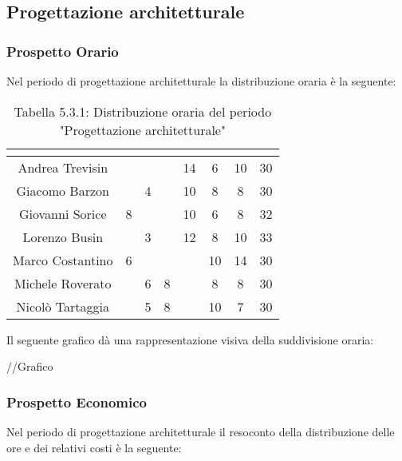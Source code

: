 \subsection{Progettazione architetturale}

\subsubsection{Prospetto Orario}
Nel periodo di progettazione architetturale la distribuzione oraria è la seguente:

\renewcommand{\arraystretch}{1.5}
\begin{table}[H]
\begin{center}
\begin{tabular}{|c|c|c|c|c|c|c|c|}
\hline
\rowcolor{title_row}
\textbf{\color{title_text}{Nome}} & \textbf{\color{title_text}{Resp.}} & \textbf{\color{title_text}{Ammi.}} & \textbf{\color{title_text}{Analist.}} & \textbf{\color{title_text}{Progett.}} & \textbf{\color{title_text}{Program.}} & \textbf{\color{title_text}{Verific.}} & \textbf{\color{title_text}{Totale}} \\ \hline
Andrea Trevisin  & & & & 14 & 6 & 10 & 30 \\ \hline
Giacomo Barzon   &  & 4 &  & 10 & 8 & 8 & 30\\ \hline
Giovanni Sorice  & 8 &  &  & 10 & 6 & 8 & 32\\ \hline
Lorenzo Busin    &  & 3  &  & 12 & 8 & 10 & 33\\ \hline
Marco Costantino & 6 &  &  &  & 10 & 14 & 30\\ \hline
Michele Roverato &  & 6 & 8 &  & 8 & 8 & 30\\ \hline
Nicolò Tartaggia &  & 5  & 8 &  & 10 & 7 & 30\\ \hline
\end{tabular}
\caption{Tabella 5.3.1: Distribuzione oraria del periodo "Progettazione architetturale"\label{}}
\end{center}
\end{table}
\renewcommand{\arraystretch}{1}

Il seguente grafico dà una rappresentazione visiva della suddivisione oraria: \\
\begin{center}
//Grafico
\end{center}


\subsubsection{Prospetto Economico}
Nel periodo di progettazione architetturale il resoconto della distribuzione delle ore e dei relativi costi è la seguente:

